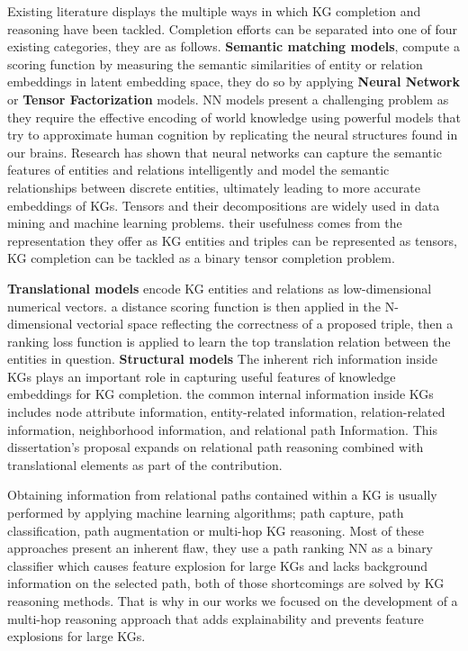 Existing literature displays the multiple ways in which KG completion and reasoning have been tackled. Completion efforts can be separated into one of four existing categories\cite{shen2022comprehensive}, they are as follows.
\textbf{Semantic matching models}, compute a scoring function by measuring the semantic similarities of entity or relation embeddings in latent embedding space, they do so by applying \textbf{Neural Network} or \textbf{Tensor Factorization} models. 
NN models \cite{socher2013reasoning, tran2020multi} present a challenging problem as they require the effective encoding of world knowledge using powerful models that try to approximate human cognition by replicating the neural structures found in our brains. Research has shown that neural networks can capture the semantic features of entities and relations intelligently and model the semantic relationships between discrete entities, ultimately leading to more accurate embeddings of KGs.
Tensors\cite{nickel2011three, balavzevic2019tucker, socher2013reasoning} and their decompositions are widely used in data mining and machine learning problems. their usefulness comes from the representation they offer as KG entities and triples can be represented as tensors, KG completion can be tackled as a binary tensor completion problem\cite{shen2022comprehensive}.

\textbf{Translational models}\cite{bordes2013translating, wang2014knowledge, lin2015learning, sun2019rotate, trouillon2016complex, dettmers2018conve} encode KG entities and relations as low-dimensional numerical vectors. a distance scoring function is then applied in the N-dimensional vectorial space reflecting the correctness of a proposed triple, then a ranking loss function is applied to learn the top translation relation between the entities in question.
\textbf{Structural models}\cite{mikolov2013efficient, pennington2014glove} The inherent rich information inside KGs plays an important role in capturing useful features of knowledge embeddings for KG completion. the common internal information inside KGs includes node attribute information, entity-related information, relation-related information, neighborhood information, and relational path Information. This dissertation's proposal expands on relational path reasoning combined with translational elements as part of the contribution.


Obtaining information from relational paths contained within a KG is usually performed by applying machine learning algorithms; path capture, path classification\cite{xiong2017deeppath}, path augmentation\cite{manchanda2023metapath, hirose2021transductive} or multi-hop KG reasoning\cite{lin2018multi, tiwari2021dapath, cui2023incorporating, cui2023reinforcement}. Most of these approaches present an inherent flaw, they use a path ranking NN as a binary classifier which causes feature explosion for large KGs and lacks background information on the selected path, both of those shortcomings are solved by KG reasoning methods. That is why in our works we focused on the development of a multi-hop reasoning approach that adds explainability and prevents feature explosions for large KGs.


